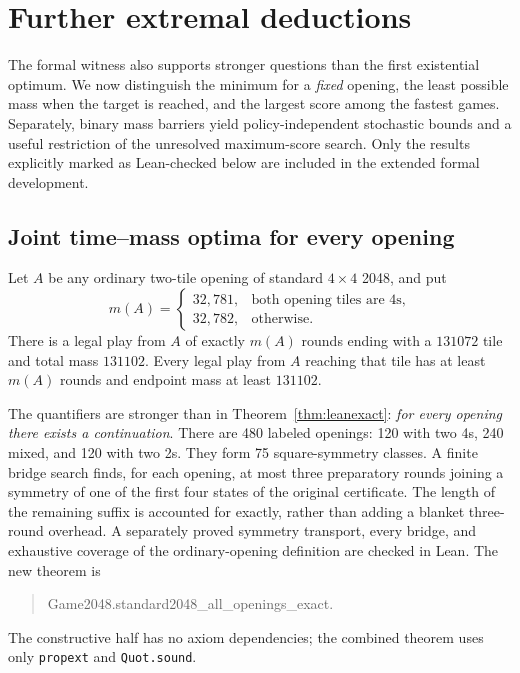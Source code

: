 \section{Further extremal deductions}\label{sec:deductions}

The formal witness also supports stronger questions than the first
existential optimum. We now distinguish the minimum for a \emph{fixed}
opening, the least possible mass when the target is reached, and the
largest score among the fastest games. Separately, binary mass barriers
yield policy-independent stochastic bounds and a useful restriction of
the unresolved maximum-score search. Only the results explicitly marked
as Lean-checked below are included in the extended formal development.

\subsection{Joint time--mass optima for every opening}

\begin{theorem}\label{thm:allopenings}
Let $A$ be any ordinary two-tile opening of standard $4\times4$ 2048, and put
\[
 m(A)=\begin{cases}
 32{,}781,&\text{both opening tiles are 4s},\\
 32{,}782,&\text{otherwise}.
 \end{cases}
\]
There is a legal play from $A$ of exactly $m(A)$ rounds ending with a
$131072$ tile and total mass $131102$. Every legal play from $A$ reaching
that tile has at least $m(A)$ rounds and endpoint mass at least $131102$.
\end{theorem}

The quantifiers are stronger than in Theorem~\ref{thm:leanexact}:
\emph{for every opening there exists a continuation}. There are 480
labeled openings: 120 with two 4s, 240 mixed, and 120 with two 2s. They
form 75 square-symmetry classes. A finite bridge search finds, for each
opening, at most three preparatory rounds joining a symmetry of one of
the first four states of the original certificate. The length of the
remaining suffix is accounted for exactly, rather than adding a blanket
three-round overhead. A separately proved symmetry transport, every
bridge, and exhaustive coverage of the ordinary-opening definition are
checked in Lean. The new theorem is
\begin{quote}\small\ttfamily
Game2048.standard2048\_all\_openings\_exact.
\end{quote}
The constructive half has no axiom dependencies; the combined theorem
uses only \texttt{propext} and \texttt{Quot.sound}.

